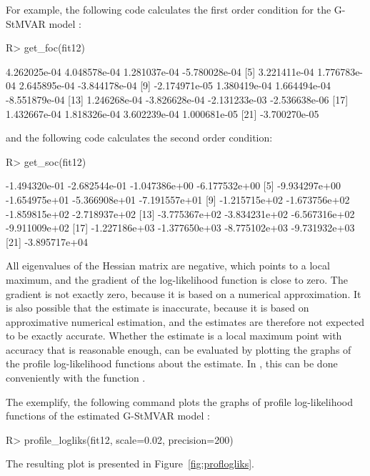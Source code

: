 \documentclass[nojss]{jss}
\begin{document}
For example, the following code calculates the first order condition for the G-StMVAR model :
%
\begin{CodeChunk}
\begin{CodeInput}
R> get_foc(fit12)
\end{CodeInput}
\begin{CodeOutput}
 [1]  4.262025e-04  4.048578e-04  1.281037e-04 -5.780028e-04
 [5]  3.221411e-04  1.776783e-04  2.645895e-04 -3.844178e-04
 [9] -2.174971e-05  1.380419e-04  1.664494e-04 -8.551879e-04
[13]  1.246268e-04 -3.826628e-04 -2.131233e-03 -2.536638e-06
[17]  1.432667e-04  1.818326e-04  3.602239e-04  1.000681e-05
[21] -3.700270e-05
\end{CodeOutput}
\end{CodeChunk}
%
and the following code calculates the second order condition:
%
\begin{CodeChunk}
\begin{CodeInput}
R> get_soc(fit12)
\end{CodeInput}
\begin{CodeOutput}
 [1] -1.494320e-01 -2.682544e-01 -1.047386e+00 -6.177532e+00
 [5] -9.934297e+00 -1.654975e+01 -5.366908e+01 -7.191557e+01
 [9] -1.215715e+02 -1.673756e+02 -1.859815e+02 -2.718937e+02
[13] -3.775367e+02 -3.834231e+02 -6.567316e+02 -9.911009e+02
[17] -1.227186e+03 -1.377650e+03 -8.775102e+03 -9.731932e+03
[21] -3.895717e+04
\end{CodeOutput}
\end{CodeChunk}
%
All eigenvalues of the Hessian matrix are negative, which points to a local maximum, and the gradient of the log-likelihood function is close to zero. The gradient is not exactly zero, because it is based on a numerical approximation. It is also possible that the estimate is inaccurate, because it is based on approximative numerical estimation, and the estimates are therefore not expected to be exactly accurate. Whether the estimate is a local maximum point with accuracy that is reasonable enough, can be evaluated by plotting the graphs of the profile log-likelihood functions about the estimate. In , this can be done conveniently with the function .

The exemplify, the following command plots the graphs of profile log-likelihood functions of the estimated G-StMVAR model :
%
\begin{CodeChunk}
\begin{CodeInput}
R> profile_logliks(fit12, scale=0.02, precision=200)
\end{CodeInput}
\end{CodeChunk}
%
The resulting plot is presented in Figure~\ref{fig:proflogliks}.
\end{document}
